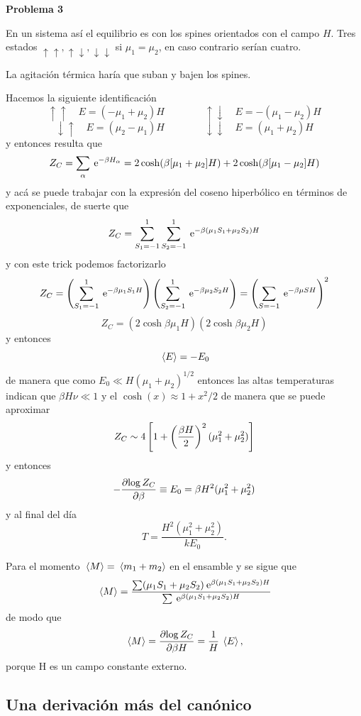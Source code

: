 \documentclass[10pt,oneside]{CBFT_book}
\begin{document}
\begin{ejemplo}{\bf Problema 3}

En un sistema así el equilibrio es con los spines orientados con el campo $H$. Tres estados
$\uparrow\uparrow, \uparrow\downarrow, \downarrow\downarrow$ si $ \mu_1 = \mu_2 $, en caso contrario
serían cuatro.

La agitación térmica haría que suban y bajen los spines.

Hacemos la siguiente identificación
\[
	\uparrow\uparrow \quad E = (-\mu_1+\mu_2) H \qquad \qquad 
	\uparrow\downarrow \quad E = -(\mu_1-\mu_2) H
\]
\[
	\downarrow\uparrow \quad E = (\mu_2-\mu_1) H \qquad \qquad 
	\downarrow\downarrow \quad E = (\mu_1+\mu_2) H
\]
y entonces resulta que
\[
	Z_C = \sum_\alpha \:\mathrm{e}^{-\beta H_\alpha} =
	2 \cosh (\beta[\mu_1+\mu_2]H) + 2 \cosh (\beta[\mu_1-\mu_2]H)
\]
y acá se puede trabajar con la expresión del coseno hiperbólico en términos de exponenciales, de suerte
que 
\[
	Z_C = \sum_{S_1=-1}^1 \sum_{S_2=-1}^1 \:\mathrm{e}^{-\beta ( \mu_1 S_1 + \mu_2 S_2 ) H}
\]
y con este trick podemos factorizarlo
\[
	Z_C =  \left( \sum_{S_1=-1}^1 \:\mathrm{e}^{-\beta \mu_1 S_1 H} \right)
	\left( \sum_{S_2=-1}^1 \:\mathrm{e}^{-\beta \mu_2 S_2 H} \right) = 
	\left( \sum_{S=-1} \:\mathrm{e}^{-\beta \mu S H} \right)^2
\]
\[
	Z_C = ( 2 \cosh \beta \mu_1 H ) ( 2 \cosh \beta \mu_2 H )
\]
y entonces
\[
	\:\left\langle E \right\rangle = -E_0
\]
de manera que como $E_0 \ll H(\mu_1+\mu_2)^{1/2}$ entonces las altas temperaturas indican que $ \beta H \nu \ll 1$
y el $\cosh (x) \approx 1 + x^2/2 $ de manera que se puede aproximar
\[
	Z_C \sim 4 \left[ 1 + \left( \frac{ \beta H }{ 2 } \right)^2 ( \mu_1^2 + \mu_2^2 ) \right]
\]
y entonces
\[
	- \frac{\partial^{\hspace{-0.05em}} {\log Z_C}}{\partial {\beta}^{\hspace{-0.05em}}} \equiv E_0 = \beta H^2 ( \mu_1^2 + \mu_2^2 )
\]
y al final del día
\[
	T = \frac{ H^2 ( \mu_1^2 + \mu_2^2 ) }{ k E_0 }.
\]

Para el momento $ \:\left\langle  M  \right\rangle = \:\left\langle  m_1 + m_2  \right\rangle$  en el ensamble y se sigue que
\[
	\:\left\langle  M  \right\rangle= \frac{ \sum ( \mu_1 S_1 + \mu_2 S_2 ) \:\mathrm{e}^{ \beta ( \mu_1 S_1 + \mu_2 S_2 ) H } }
	{ \sum \:\mathrm{e}^{ \beta ( \mu_1 S_1 + \mu_2 S_2 ) H } }
\]
de modo que
\[
	\:\left\langle  M  \right\rangle = \frac{\partial^{\hspace{-0.05em}} { \log Z_C }}{\partial {\beta H}^{\hspace{-0.05em}}} = \frac{1}{H} \:\left\langle  E  \right\rangle,
\]
porque H es un campo constante externo.

\end{ejemplo}



\subsection{Una derivación más del canónico}
\end{document}

